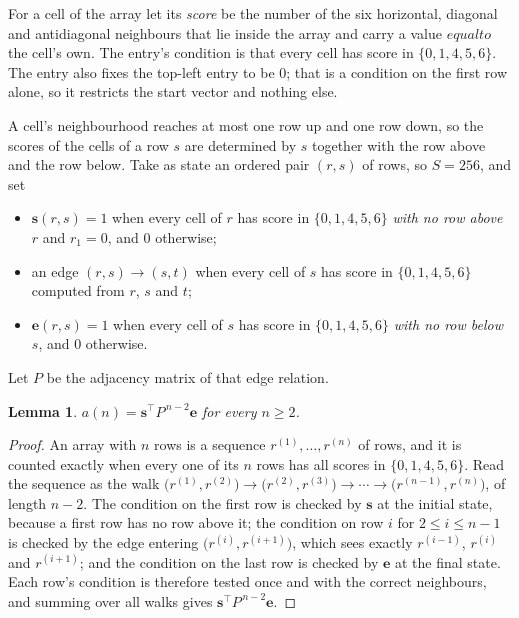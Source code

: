 \documentclass[11pt,a4paper]{article}
\theoremstyle{plain}
\newtheorem{lemma}[theorem]{Lemma}
\theoremstyle{definition}
\begin{document}
For a cell of the array let its \emph{score} be the number of the six horizontal, diagonal and antidiagonal neighbours that lie inside
the array and carry a value $equal to$ the cell's own. The entry's condition is that every cell
has score in $\{0,1,4,5,6\}$. The entry also fixes the top-left entry to be $0$; that is a condition on the first row alone, so it restricts the start vector and nothing else.

A cell's neighbourhood reaches at most one row up and one row down, so the scores of the
cells of a row $s$ are determined by $s$ together with the row above and the row below.
Take as state an ordered pair $(r,s)$ of rows, so $S=256$, and set
\begin{itemize}
\item $\mathbf{s}(r,s)=1$ when every cell of $r$ has score in $\{0,1,4,5,6\}$ \emph{with no row
above $r$} and $r_1=0$, and $0$ otherwise;
\item an edge $(r,s)\to(s,t)$ when every cell of $s$ has score in $\{0,1,4,5,6\}$ computed from
$r$, $s$ and $t$;
\item $\mathbf{e}(r,s)=1$ when every cell of $s$ has score in $\{0,1,4,5,6\}$ \emph{with no row
below $s$}, and $0$ otherwise.
\end{itemize}
Let $P$ be the adjacency matrix of that edge relation.

\begin{lemma}\label{lem:walk}
$a(n)=\mathbf{s}^{\!\top}P^{\,n-2}\mathbf{e}$ for every $n\ge2$.
\end{lemma}

\begin{proof}
An array with $n$ rows is a sequence $r^{(1)},\dots,r^{(n)}$ of rows, and it is counted
exactly when every one of its $n$ rows has all scores in $\{0,1,4,5,6\}$. Read the sequence as the
walk $\bigl(r^{(1)},r^{(2)}\bigr)\to\bigl(r^{(2)},r^{(3)}\bigr)\to\cdots\to
\bigl(r^{(n-1)},r^{(n)}\bigr)$, of length $n-2$. The condition on the first row is
checked by $\mathbf{s}$ at the initial state, because a first row has no row above it; the
condition on row $i$ for $2\le i\le n-1$ is checked by the edge entering
$\bigl(r^{(i)},r^{(i+1)}\bigr)$, which sees exactly $r^{(i-1)}$, $r^{(i)}$ and
$r^{(i+1)}$; and the condition on the last row is checked by $\mathbf{e}$ at the final
state. Each row's condition is therefore tested once and with the correct neighbours, and
summing over all walks gives $\mathbf{s}^{\!\top}P^{\,n-2}\mathbf{e}$.
\end{proof}
\end{document}
